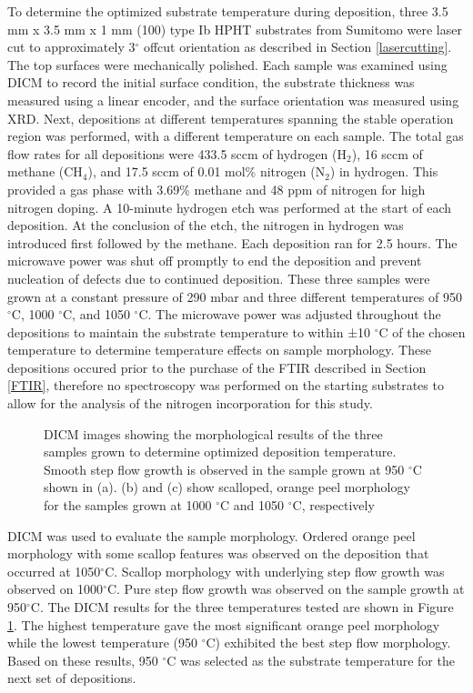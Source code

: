 To determine the optimized substrate temperature during deposition, three 3.5 mm x 3.5 mm x 1 mm (100) type Ib HPHT substrates from Sumitomo were laser cut to approximately 3$^{\circ}$ offcut orientation as described in Section \ref{lasercutting}. The top surfaces were mechanically polished. Each sample was examined using DICM to record the initial surface condition, the substrate thickness was measured using a linear encoder, and the surface orientation was measured using XRD. Next, depositions at different temperatures spanning the stable operation region was performed, with a different temperature on each sample. The total gas flow rates for all depositions were 433.5 sccm of hydrogen (H$_2$), 16 sccm of methane (CH$_4$), and 17.5 sccm of 0.01 mol\% nitrogen (N$_2$) in hydrogen. This provided a gas phase with 3.69\% methane and 48 ppm of nitrogen for high nitrogen doping. A 10-minute hydrogen etch was performed at the start of each deposition. At the conclusion of the etch, the nitrogen in hydrogen was introduced first followed by the methane. Each deposition ran for 2.5 hours. The microwave power was shut off promptly to end the deposition and prevent nucleation of defects due to continued deposition. These three samples were grown at a constant pressure of 290 mbar and three different temperatures of 950 $^{\circ}$C, 1000 $^{\circ}$C, and 1050 $^{\circ}$C. The microwave power was adjusted throughout the depositions to maintain the substrate temperature to within ±10 $^{\circ}$C of the chosen temperature to determine temperature effects on sample morphology.  These depositions occured prior to the purchase of the FTIR described in Section \ref{FTIR}, therefore no spectroscopy was performed on the starting substrates to allow for the analysis of the nitrogen incorporation for this study.
	
\begin{figure}
    \centering
    
	\caption{DICM images showing the morphological results of the three samples grown to determine optimized deposition temperature. Smooth step flow growth is observed in the sample grown at 950 $^{\circ}$C shown in (a). (b) and (c) show scalloped, orange peel morphology for the samples grown at 1000 $^{\circ}$C and 1050 $^{\circ}$C, respectively}
	\label{fig: TempOptMorph}
\end{figure}

DICM was used to evaluate the sample morphology. Ordered orange peel morphology with some scallop features was observed on the deposition that occurred at 1050$^\circ$C. Scallop morphology with underlying step flow growth was observed on 1000$^\circ$C. Pure step flow growth was observed on the sample growth at 950$^\circ$C. The DICM results for the three temperatures tested are shown in Figure \ref{fig: TempOptMorph}. The highest temperature gave the most significant orange peel morphology while the lowest temperature (950 $^{\circ}$C) exhibited the best step flow morphology. Based on these results, 950 $^{\circ}$C was selected as the substrate temperature for the next set of depositions.


